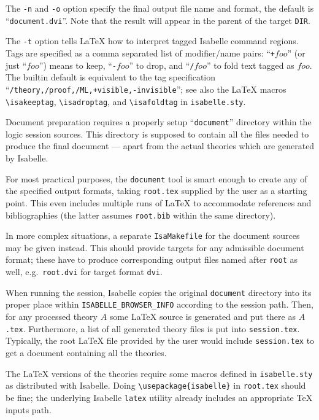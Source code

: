 \medskip The \texttt{-n} and \texttt{-o} option specify the final output file
name and format, the default is ``\texttt{document.dvi}''.  Note that the
result will appear in the parent of the target \texttt{DIR}.

\medskip The \texttt{-t} option tells {\LaTeX} how to interpret tagged
Isabelle command regions.  Tags are specified as a comma separated list of
modifier/name pairs: ``\verb,+,$foo$'' (or just ``$foo$'') means to keep,
``\verb,-,$foo$'' to drop, and ``\verb,/,$foo$'' to fold text tagged as $foo$.
The builtin default is equivalent to the tag specification
``\texttt{/theory,/proof,/ML,+visible,-invisible}''; see also the {\LaTeX}
macros \verb,\isakeeptag,, \verb,\isadroptag,, and \verb,\isafoldtag, in
\texttt{isabelle.sty}.

\medskip Document preparation requires a properly setup ``\texttt{document}''
directory within the logic session sources.  This directory is supposed to
contain all the files needed to produce the final document --- apart from the
actual theories which are generated by Isabelle.

\medskip For most practical purposes, the \texttt{document} tool is smart
enough to create any of the specified output formats, taking \texttt{root.tex}
supplied by the user as a starting point.  This even includes multiple runs of
{\LaTeX} to accommodate references and bibliographies (the latter assumes
\texttt{root.bib} within the same directory).

In more complex situations, a separate \texttt{IsaMakefile} for the document
sources may be given instead.  This should provide targets for any admissible
document format; these have to produce corresponding output files named after
\texttt{root} as well, e.g.\ \texttt{root.dvi} for target format \texttt{dvi}.

\medskip When running the session, Isabelle copies the original
\texttt{document} directory into its proper place within
\texttt{ISABELLE_BROWSER_INFO} according to the session path.  Then, for any
processed theory $A$ some {\LaTeX} source is generated and put there as
$A$\texttt{.tex}.  Furthermore, a list of all generated theory files is put
into \texttt{session.tex}.  Typically, the root {\LaTeX} file provided by the
user would include \texttt{session.tex} to get a document containing all the
theories.

The {\LaTeX} versions of the theories require some macros defined in
\texttt{isabelle.sty} as distributed with Isabelle.  Doing
\verb,\usepackage{isabelle}, in \texttt{root.tex} should be fine; the
underlying Isabelle \texttt{latex} utility already includes an appropriate
{\TeX} inputs path.

